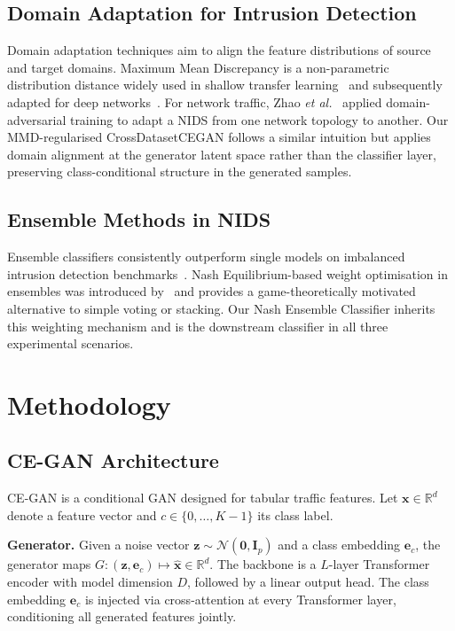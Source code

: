 \documentclass[conference]{IEEEtran}
\begin{document}
\subsection{Domain Adaptation for Intrusion Detection}
Domain adaptation techniques aim to align the feature distributions of source
and target domains.
Maximum Mean Discrepancy is a non-parametric distribution distance widely
used in shallow transfer learning~\cite{gretton2012kernel} and subsequently
adapted for deep networks~\cite{long2015learning}.
For network traffic, Zhao \emph{et al.}~\cite{zhao2020transfer} applied
domain-adversarial training to adapt a NIDS from one network topology to
another.
Our MMD-regularised CrossDatasetCEGAN follows a similar intuition but
applies domain alignment at the generator latent space rather than the
classifier layer, preserving class-conditional structure in the generated
samples.

\subsection{Ensemble Methods in NIDS}
Ensemble classifiers consistently outperform single models on imbalanced
intrusion detection benchmarks~\cite{zhang2019network}.
Nash Equilibrium-based weight optimisation in ensembles was introduced
by~\cite{paruchuri2008playing} and provides a game-theoretically
motivated alternative to simple voting or stacking.
Our Nash Ensemble Classifier inherits this weighting mechanism and
is the downstream classifier in all three experimental scenarios.

\section{Methodology}

\subsection{CE-GAN Architecture}

CE-GAN is a conditional GAN designed for tabular traffic features.
Let $\mathbf{x} \in \mathbb{R}^d$ denote a feature vector and
$c \in \{0,\ldots,K-1\}$ its class label.

\textbf{Generator.}
Given a noise vector $\mathbf{z} \sim \mathcal{N}(\mathbf{0}, \mathbf{I}_p)$
and a class embedding $\mathbf{e}_c$, the generator maps
$G: (\mathbf{z}, \mathbf{e}_c) \mapsto \hat{\mathbf{x}} \in \mathbb{R}^d$.
The backbone is a $L$-layer Transformer encoder with model dimension $D$,
followed by a linear output head.
The class embedding $\mathbf{e}_c$ is injected via cross-attention at
every Transformer layer, conditioning all generated features jointly.
\end{document}
